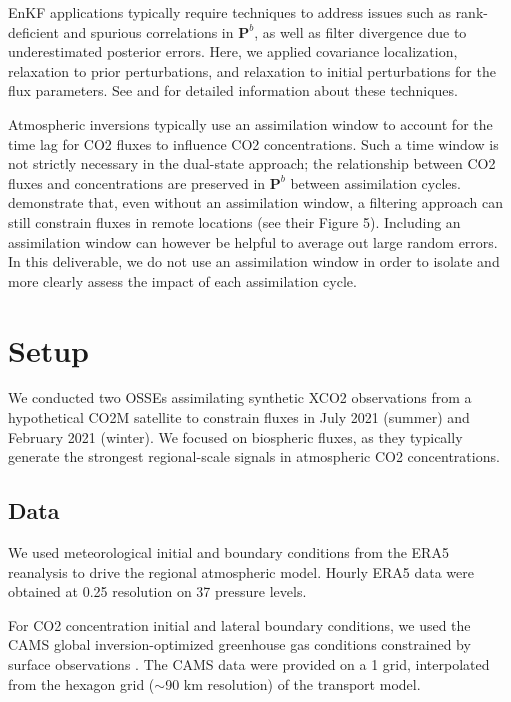 \documentclass[a4,12pt]{article}
\begin{document}
EnKF applications typically require techniques to address issues such as rank-deficient and spurious correlations in $\mathbf{P}^b$,
as well as filter divergence due to underestimated posterior errors.
Here,
we applied covariance localization,
relaxation to prior perturbations,
and relaxation to initial perturbations for the flux parameters.
See \citet{chen2023} and \citet{houtekamer2016} for detailed information about these techniques.

Atmospheric inversions typically use an assimilation window to account for the time lag for CO2 fluxes to influence CO2 concentrations.
Such a time window is not strictly necessary in the dual-state approach;
the relationship between CO2 fluxes and concentrations are preserved in $\mathbf{P}^b$ between assimilation cycles.
\citet{chen2023} demonstrate that,
even without an assimilation window,
a filtering approach can still constrain fluxes in remote locations
(see their Figure 5).
Including an assimilation window can however be helpful to average out large random errors.
In this deliverable,
we do not use an assimilation window in order to isolate and more clearly assess the impact of each assimilation cycle.


\section{Setup}

We conducted two OSSEs assimilating synthetic XCO2 observations from a hypothetical CO2M satellite
to constrain fluxes in July 2021 (summer) and February 2021 (winter).
We focused on biospheric fluxes,
as they typically generate the strongest regional-scale signals in  atmospheric CO2 concentrations.


\subsection{Data}

We used meteorological initial and boundary conditions from the ERA5 reanalysis \citep{hersbach2020} to drive the regional atmospheric model.
Hourly ERA5 data were obtained at 0.25\degree{} resolution on 37 pressure levels.

For CO2 concentration initial and lateral boundary conditions,
we used the CAMS global inversion-optimized greenhouse gas conditions constrained by surface observations \citep{chevallier2010}.
The CAMS data were provided on a 1\degree{} grid,
interpolated from the hexagon grid ($\sim$90 km resolution) of the transport model.
\end{document}
